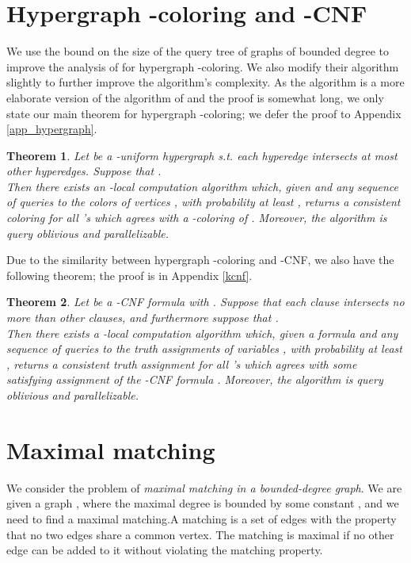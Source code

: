 \documentclass[english, oribibl]{llncs}
\newtheorem{theorem}{Theorem}[section]
\begin{document}
\section{\texorpdfstring{Hypergraph -coloring and -CNF}{Hypergraph 2-coloring and k-CNF}}
\label{hypergraph}
We use the bound  on the size of the query tree of graphs of bounded degree to improve the analysis of \cite{ARV+11} for hypergraph -coloring. We also modify their algorithm slightly to further improve the algorithm's complexity.
As the algorithm is a more elaborate version of the algorithm of \cite{ARV+11} and the proof is somewhat long, we only state our main theorem for hypergraph -coloring; we defer the proof to  Appendix \ref{app_hypergraph}.
\begin{theorem}
Let  be a -uniform hypergraph s.t. each hyperedge intersects at most  other hyperedges.
Suppose that . \\
Then there exists an  -local computation algorithm which, given  and any sequence of
queries to the colors of vertices  , 
with probability at least ,
returns a consistent coloring for all 's which 
agrees with a -coloring of . 
Moreover, the algorithm is query oblivious and parallelizable. 
\end{theorem}

Due to the similarity between hypergraph -coloring and -CNF, we also have the following theorem; the proof is in Appendix \ref{kcnf}.
\begin{theorem}
Let  be a -CNF formula with . 
Suppose that each clause intersects no more than  other clauses,
and furthermore suppose that .\\
Then there exists a -local computation algorithm which, given a formula  and any sequence of
queries to the truth assignments of variables , 
with probability at least ,
returns a consistent truth assignment for all 's which agrees with some 
satisfying assignment of the -CNF formula . 
Moreover, the algorithm is query oblivious and parallelizable. 
\end{theorem}

\section{Maximal matching}
\label{section:matching}

We consider the problem of \emph{maximal matching in a bounded-degree graph}. We are given a graph , where the maximal degree is bounded by some constant , and we need to find a maximal matching.A matching is a set of edges with the property that no two edges share a common vertex. The matching is maximal if no other edge can be added to it without violating the matching property. 
\end{document}
